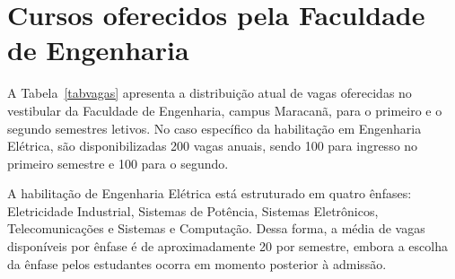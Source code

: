 \section{Cursos oferecidos pela Faculdade de Engenharia}

A Tabela~\ref{tabvagas} apresenta a distribuição atual de vagas oferecidas no vestibular da Faculdade de Engenharia, campus Maracanã, para o primeiro e o segundo semestres letivos. No caso específico da habilitação em Engenharia Elétrica, são disponibilizadas 200 vagas anuais, sendo 100 para ingresso no primeiro semestre e 100 para o segundo.

A habilitação de Engenharia Elétrica está estruturado em quatro ênfases: Eletricidade Industrial, Sistemas de Potência, Sistemas Eletrônicos, Telecomunicações e Sistemas e Computação. Dessa forma, a média de vagas disponíveis por ênfase é de aproximadamente 20 por semestre, embora a escolha da ênfase pelos estudantes ocorra em momento posterior à admissão.


